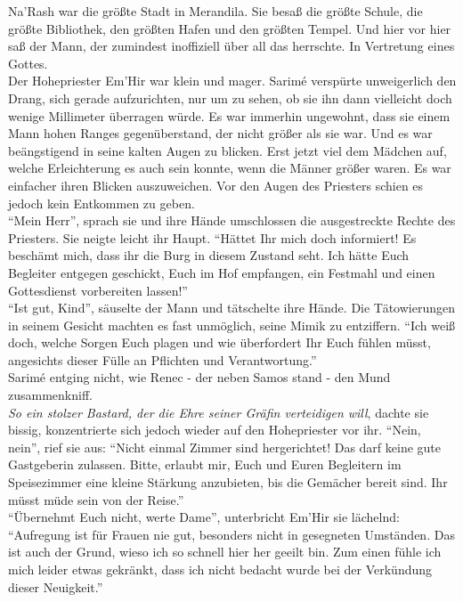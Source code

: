 Na'Rash war die größte Stadt in Merandila. Sie besaß die größte Schule, die größte Bibliothek, den 
größten Hafen und den größten Tempel. Und hier vor hier saß der Mann, der zumindest inoffiziell 
über all das herrschte. In Vertretung eines Gottes. \\
Der Hohepriester Em'Hir war klein und mager. Sarimé verspürte unweigerlich den Drang, sich gerade 
aufzurichten, nur um zu sehen, ob sie ihn dann vielleicht doch wenige Millimeter überragen würde. 
Es war immerhin ungewohnt, dass sie einem Mann hohen Ranges gegenüberstand, der nicht größer
als sie war. Und es war beängstigend in seine kalten Augen zu blicken. Erst jetzt viel dem 
Mädchen auf, welche Erleichterung es auch sein konnte, wenn die Männer größer waren. Es war 
einfacher ihren Blicken auszuweichen. Vor den Augen des Priesters schien es jedoch kein Entkommen zu 
geben.\\
``Mein Herr'', sprach sie und ihre Hände umschlossen die ausgestreckte Rechte des Priesters. Sie 
neigte leicht ihr Haupt. ``Hättet Ihr mich doch informiert! Es beschämt mich, dass ihr die Burg in 
diesem Zustand seht. Ich hätte Euch Begleiter entgegen geschickt, Euch im Hof empfangen, ein 
Festmahl und einen Gottesdienst vorbereiten lassen!''\\
``Ist gut, Kind'', säuselte der Mann und tätschelte ihre Hände. Die Tätowierungen in seinem Gesicht 
machten es fast unmöglich, seine Mimik zu entziffern. ``Ich weiß doch, welche Sorgen Euch plagen 
und wie überfordert Ihr Euch fühlen müsst, angesichts dieser Fülle an Pflichten und 
Verantwortung.''\\
Sarimé entging nicht, wie Renec - der neben Samos stand - den Mund zusammenkniff. \\
\textit{So ein stolzer Bastard, der die Ehre seiner Gräfin verteidigen will}, dachte sie bissig, 
konzentrierte sich jedoch wieder auf den Hohepriester vor ihr. ``Nein, nein'', rief sie aus: 
``Nicht einmal Zimmer sind hergerichtet! Das darf keine gute Gastgeberin zulassen. Bitte, erlaubt 
mir, Euch und Euren Begleitern im Speisezimmer eine kleine Stärkung anzubieten, bis die Gemächer 
bereit sind. Ihr müsst müde sein von der Reise.''\\
``Übernehmt Euch nicht, werte Dame'', unterbricht Em'Hir sie lächelnd: ``Aufregung ist für Frauen 
nie gut, besonders nicht in gesegneten Umständen. Das ist auch der Grund, wieso ich so schnell 
hier her geeilt bin. Zum einen fühle ich mich leider etwas gekränkt, dass ich nicht bedacht wurde 
bei der Verkündung dieser Neuigkeit.''\\
